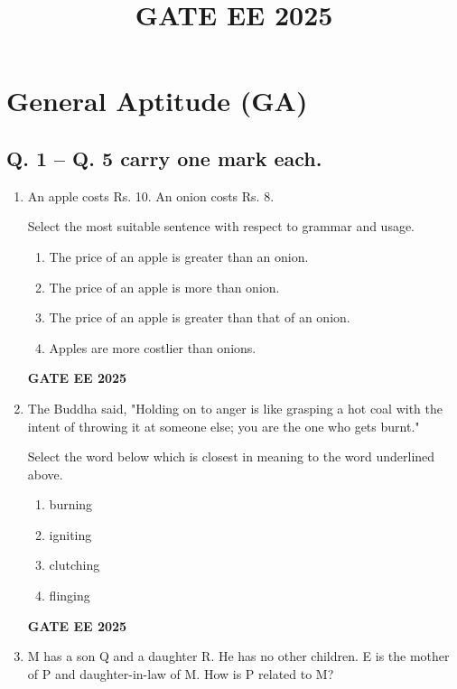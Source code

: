 \documentclass{article}
\title{GATE EE 2025}
\date{}
\begin{document}
\maketitle

\section*{General Aptitude (GA)}

\subsection*{Q. 1 – Q. 5 carry one mark each.}

\begin{enumerate}[label=Q.\arabic*]
    \item An apple costs Rs. 10. An onion costs Rs. 8. 
    
    Select the most suitable sentence with respect to grammar and usage.
    
    \begin{enumerate}[label=(\Alph*)]
        \item The price of an apple is greater than an onion.
        \item The price of an apple is more than onion.
        \item The price of an apple is greater than that of an onion.
        \item Apples are more costlier than onions.
    \end{enumerate}
    
    \textbf{GATE EE 2025}
    
    \item The Buddha said, "Holding on to anger is like grasping a hot coal with the intent of throwing it at someone else; you are the one who gets burnt."
    
    Select the word below which is closest in meaning to the word underlined above.
    
    \begin{enumerate}[label=(\Alph*)]
        \item burning 
        \item igniting 
        \item clutching 
        \item flinging
    \end{enumerate}
    
    \textbf{GATE EE 2025}
    
    \item M has a son Q and a daughter R. He has no other children. E is the mother of P and daughter-in-law of M. How is P related to M?
    

\end{enumerate}
\end{document}
